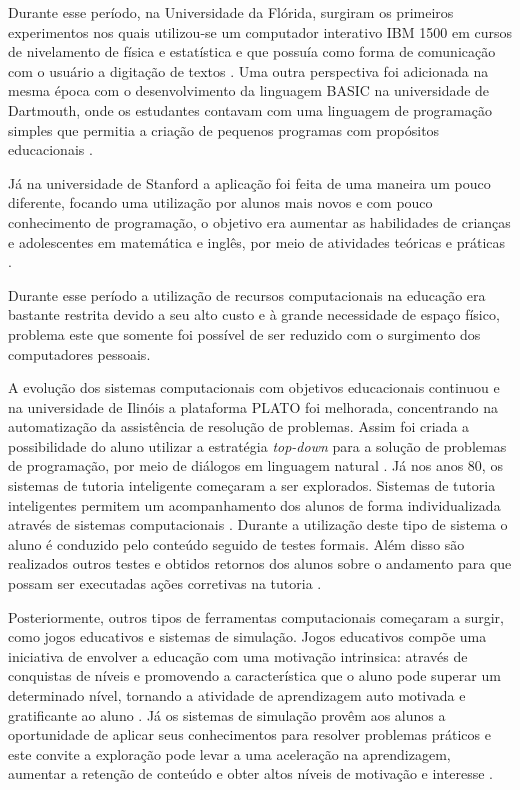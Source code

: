 Durante esse período, na Universidade da Flórida, surgiram os primeiros experimentos nos quais utilizou-se um computador interativo IBM 1500 em cursos de nivelamento de física e estatística e que possuía como forma de comunicação com o usuário a digitação de textos \cite{chambers80}. Uma outra perspectiva foi adicionada na mesma época com o desenvolvimento da linguagem BASIC na universidade de Dartmouth, onde os estudantes contavam com uma linguagem de programação simples que permitia a criação de pequenos programas com propósitos educacionais \cite{chambers80}. 

Já na universidade de Stanford a aplicação foi feita de uma maneira um pouco diferente, focando uma utilização por alunos mais novos e com pouco conhecimento de programação, o objetivo era aumentar as habilidades de crianças e adolescentes em matemática e inglês, por meio de atividades teóricas e práticas \cite{chambers80}.

Durante esse período a utilização de recursos computacionais na educação era bastante restrita devido a seu alto custo e à grande necessidade de espaço físico, problema este que somente foi possível de ser reduzido com o surgimento dos computadores pessoais. 

A evolução dos sistemas computacionais com objetivos educacionais continuou e na universidade de Ilinóis a plataforma PLATO foi melhorada, concentrando na automatização da assistência de resolução de problemas. Assim foi criada a possibilidade do aluno utilizar a estratégia \emph{top-down} para a solução de problemas de programação, por meio de diálogos em linguagem natural \cite{danielson75}. Já nos anos 80, os sistemas de tutoria inteligente começaram a ser explorados. Sistemas de tutoria inteligentes permitem um acompanhamento dos alunos de forma individualizada através de sistemas computacionais \cite{bloom84}. Durante a utilização deste tipo de sistema o aluno é conduzido pelo conteúdo seguido de testes formais. Além disso são realizados outros testes e obtidos retornos dos alunos sobre o andamento para que possam ser executadas ações corretivas na tutoria \cite{bloom84}.

Posteriormente, outros tipos de ferramentas computacionais começaram a surgir, como jogos educativos e sistemas de simulação. Jogos educativos compõe uma iniciativa de envolver a educação com uma motivação intrinsica: através de conquistas de níveis e promovendo a característica que o aluno pode superar um determinado nível, tornando a atividade de aprendizagem auto motivada e gratificante ao aluno \cite{amory99}. Já os sistemas de simulação provêm aos alunos a oportunidade de aplicar seus conhecimentos para resolver problemas práticos e este  convite a exploração pode levar a uma aceleração na aprendizagem, aumentar a retenção de conteúdo e obter altos níveis de motivação e interesse \cite{vandam07}.

